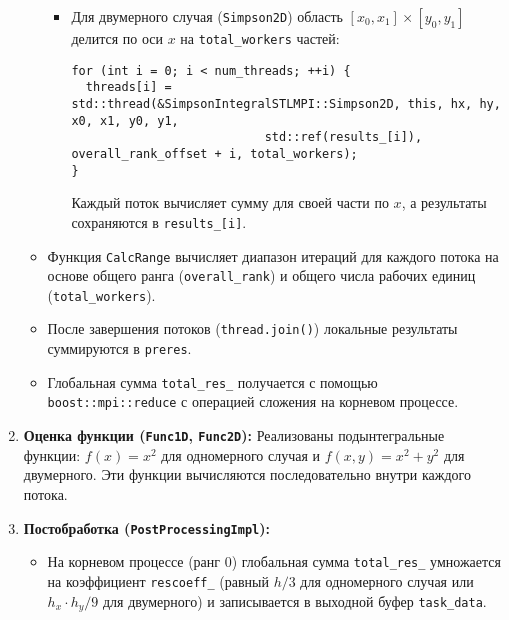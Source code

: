 \documentclass[12pt]{article}
\begin{document}
\begin{enumerate}
\begin{itemize}
\begin{itemize}
      \item Для двумерного случая (\texttt{Simpson2D}) область $[x_0, x_1] \times [y_0, y_1]$ делится по оси $x$ на \texttt{total\_workers} частей:
      \begin{lstlisting}
for (int i = 0; i < num_threads; ++i) {
  threads[i] = std::thread(&SimpsonIntegralSTLMPI::Simpson2D, this, hx, hy, x0, x1, y0, y1, 
                           std::ref(results_[i]), overall_rank_offset + i, total_workers);
}
      \end{lstlisting}
      Каждый поток вычисляет сумму для своей части по $x$, а результаты сохраняются в \texttt{results\_[i]}.
    \end{itemize}
    \item Функция \texttt{CalcRange} вычисляет диапазон итераций для каждого потока на основе общего ранга (\texttt{overall\_rank}) и общего числа рабочих единиц (\texttt{total\_workers}).
    \item После завершения потоков (\texttt{thread.join()}) локальные результаты суммируются в \texttt{preres}.
    \item Глобальная сумма \texttt{total\_res\_} получается с помощью \texttt{boost::mpi::reduce} с операцией сложения на корневом процессе.
  \end{itemize}

  \item \textbf{Оценка функции (\texttt{Func1D}, \texttt{Func2D}):}
  Реализованы подынтегральные функции: $f(x) = x^2$ для одномерного случая и $f(x, y) = x^2 + y^2$ для двумерного. Эти функции вычисляются последовательно внутри каждого потока.

  \item \textbf{Постобработка (\texttt{PostProcessingImpl}):}
  \begin{itemize}
    \item На корневом процессе (ранг 0) глобальная сумма \texttt{total\_res\_} умножается на коэффициент \texttt{rescoeff\_} (равный $h / 3$ для одномерного случая или $h_x \cdot h_y / 9$ для двумерного) и записывается в выходной буфер \texttt{task\_data}.
  \end{itemize}
\end{enumerate}
\end{document}

